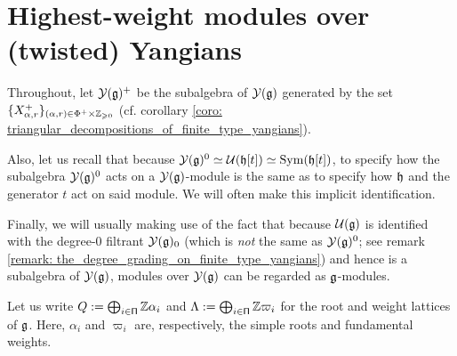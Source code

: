 \section{Highest-weight modules over (twisted) Yangians} \label{section: highest_weight_modules_for_finite_yangians}
    \begin{convention}
        Throughout, let $\mathcal{Y}(\mathfrak{g})^+$ be the  subalgebra of $\mathcal{Y}(\mathfrak{g})$ generated by the set $\{ X^+_{\alpha, r} \}_{(\alpha, r) \in \Phi^+ \x \Z_{\geq 0}}$ (cf. corollary \ref{coro: triangular_decompositions_of_finite_type_yangians}).

        Also, let us recall that because $\mathcal{Y}(\mathfrak{g})^0 \simeq \mathcal{U}(\mathfrak{h}[t]) \simeq \mathrm{Sym}(\mathfrak{h}[t])$, to specify how the subalgebra $\mathcal{Y}(\mathfrak{g})^0$ acts on a $\mathcal{Y}(\mathfrak{g})$-module is the same as to specify how $\mathfrak{h}$ and the generator $t$ act on said module. We will often make this implicit identification.

        Finally, we will usually making use of the fact that because $\mathcal{U}(\mathfrak{g})$ is identified with the degree-$0$ filtrant $\mathcal{Y}(\mathfrak{g})_0$ (which is \textit{not} the same as $\mathcal{Y}(\mathfrak{g})^0$; see remark \ref{remark: the_degree_grading_on_finite_type_yangians}) and hence is a subalgebra of $\mathcal{Y}(\mathfrak{g})$, modules over $\mathcal{Y}(\mathfrak{g})$ can be regarded as $\mathfrak{g}$-modules.
    \end{convention}

    \begin{convention}
        Let us write $Q := \bigoplus_{i \in \mathsf{\Pi}} \mathbb{Z} \alpha_i$ and $\Lambda := \bigoplus_{i \in \mathsf{\Pi}} \mathbb{Z} \varpi_i$ for the root and weight lattices of $\mathfrak{g}$. Here, $\alpha_i$ and $\varpi_i$ are, respectively, the simple roots and fundamental weights.
    \end{convention}

